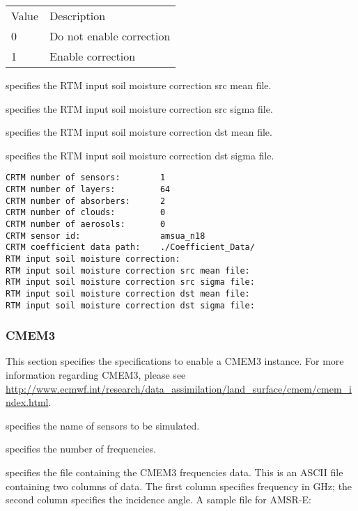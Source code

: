  \begin{tabular}{ll}
 Value & Description              \\
 0     & Do not enable correction \\
 1     & Enable correction        \\
 \end{tabular}

  specifies
 the RTM input soil moisture correction src mean file.

  specifies
 the RTM input soil moisture correction src sigma file.

  specifies
 the RTM input soil moisture correction dst mean file.

  specifies
 the RTM input soil moisture correction dst sigma file.
 

 \begin{Verbatim}[frame=single]
CRTM number of sensors:        1
CRTM number of layers:         64
CRTM number of absorbers:      2
CRTM number of clouds:         0 
CRTM number of aerosols:       0 
CRTM sensor id:                amsua_n18  
CRTM coefficient data path:    ./Coefficient_Data/
RTM input soil moisture correction:
RTM input soil moisture correction src mean file:
RTM input soil moisture correction src sigma file:
RTM input soil moisture correction dst mean file:
RTM input soil moisture correction dst sigma file:
 \end{Verbatim}

 
 \subsubsection{CMEM3} \label{ssec:cmem3}
 This section specifies the specifications to enable a CMEM3 instance.
 For more information regarding CMEM3, please see \\
 \hyperref{http://www.ecmwf.int/research/data\_assimilation/land\_surface/cmem/cmem\_index.html}{}{}{http://www.ecmwf.int/research/data\_assimilation/land\_surface/cmem/cmem\_index.html}.

  specifies the name of sensors to be simulated.

  specifies the number of
 frequencies.

  specifies the file
 containing the CMEM3 frequencies data.
 This is an ASCII file containing two columns of data.
 The first column specifies frequency in GHz; the second column
 specifies the incidence angle.  A sample file for AMSR-E:

